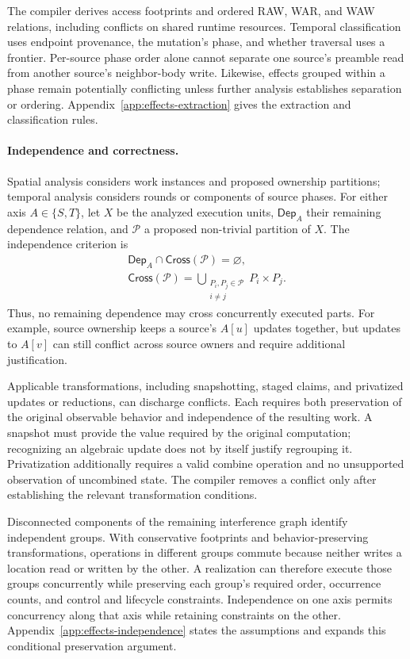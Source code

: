 The compiler derives access footprints and ordered RAW, WAR, and WAW
relations, including conflicts on shared runtime resources. Temporal
classification uses endpoint provenance, the mutation's phase, and
whether traversal uses a frontier. Per-source phase order alone cannot
separate one source's preamble read from another source's neighbor-body
write. Likewise, effects grouped within a phase remain potentially
conflicting unless further analysis establishes separation or ordering.
Appendix~\ref{app:effects-extraction} gives the extraction and
classification rules.

\paragraph{Independence and correctness.}
Spatial analysis considers work instances and proposed ownership
partitions; temporal analysis considers rounds or components of source
phases. For either axis $A\in\{S,T\}$, let $X$ be the analyzed execution
units, $\mathsf{Dep}_A$ their remaining dependence relation, and
$\mathcal P$ a proposed non-trivial partition of $X$. The independence
criterion is
\begin{equation}
\begin{gathered}
\mathsf{Dep}_A\cap\mathsf{Cross}(\mathcal P)=\varnothing,\\
\mathsf{Cross}(\mathcal P)=
\bigcup_{\substack{P_i,P_j\in\mathcal P\\i\ne j}}P_i\times P_j.
\end{gathered}
\label{eq:effects-independence}
\end{equation}
Thus, no remaining dependence may cross concurrently executed parts.
For example, source ownership keeps a source's $A[u]$ updates together,
but updates to $A[v]$ can still conflict across source owners and require
additional justification.

Applicable transformations, including snapshotting, staged claims, and
privatized updates or reductions, can discharge conflicts. Each requires
both preservation of the original observable behavior and independence
of the resulting work. A snapshot must provide the value required by
the original computation; recognizing an algebraic update does not by
itself justify regrouping it. Privatization additionally requires a valid
combine operation and no unsupported observation of uncombined state.
The compiler removes a conflict only after establishing the relevant
transformation conditions.

Disconnected components of the remaining interference graph identify
independent groups. With conservative footprints and behavior-preserving
transformations, operations in different groups commute because neither
writes a location read or written by the other. A realization can
therefore execute those groups concurrently while preserving each
group's required order, occurrence counts, and control and lifecycle
constraints. Independence on one axis permits concurrency along that
axis while retaining constraints on the other.
Appendix~\ref{app:effects-independence} states the assumptions and
expands this conditional preservation argument.

